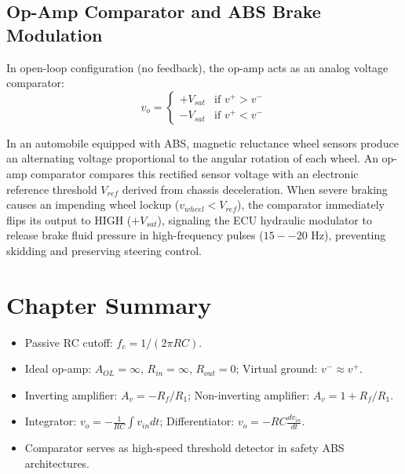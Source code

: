 \subsection{Op-Amp Comparator and ABS Brake Modulation}
In open-loop configuration (no feedback), the op-amp acts as an analog voltage comparator:
\begin{equation}
v_o = \begin{cases} +V_{sat} & \text{if } v^+ > v^- \\ -V_{sat} & \text{if } v^+ < v^- \end{cases}
\end{equation}
\begin{important}
In an automobile equipped with ABS, magnetic reluctance wheel sensors produce an alternating voltage proportional to the angular rotation of each wheel. An op-amp comparator compares this rectified sensor voltage with an electronic reference threshold $V_{ref}$ derived from chassis deceleration. When severe braking causes an impending wheel lockup ($v_{wheel} < V_{ref}$), the comparator immediately flips its output to HIGH ($+V_{sat}$), signaling the ECU hydraulic modulator to release brake fluid pressure in high-frequency pulses ($15--20\text{ Hz}$), preventing skidding and preserving steering control.
\end{important}

\section{Chapter Summary}
\begin{itemize}[leftmargin=1.5em]
    \item Passive RC cutoff: $f_c = 1/(2\pi RC)$.
    \item Ideal op-amp: $A_{OL}=\infty$, $R_{in}=\infty$, $R_{out}=0$; Virtual ground: $v^- \approx v^+$.
    \item Inverting amplifier: $A_v = -R_f/R_1$; Non-inverting amplifier: $A_v = 1 + R_f/R_1$.
    \item Integrator: $v_o = -\frac{1}{RC}\int v_{in} dt$; Differentiator: $v_o = -RC \frac{dv_{in}}{dt}$.
    \item Comparator serves as high-speed threshold detector in safety ABS architectures.
\end{itemize}
